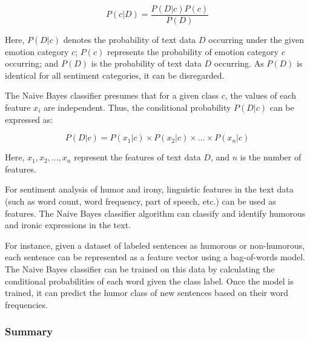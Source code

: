 \documentclass[a4paper]{article}
\begin{document}
$$P(c|D)=\dfrac{P(D|c)P(c)}{P(D)}$$

Here, $P(D|c)$ denotes the probability of text data $D$ occurring under the given emotion category $c$; $P(c)$ represents the probability of emotion category $c$ occurring; and $P(D)$ is the probability of text data $D$ occurring. As $P(D)$ is identical for all sentiment categories, it can be disregarded.

The Naive Bayes classifier presumes that for a given class $c$, the values of each feature $x_i$ are independent. Thus, the conditional probability $P(D|c)$ can be expressed as:

$$P(D|c)=P(x_1|c) \times P(x_2|c) \times ... \times P(x_n|c)$$

Here, $x_1, x_2, ..., x_n$ represent the features of text data $D$, and $n$ is the number of features.

For sentiment analysis of humor and irony, linguistic features in the text data (such as word count, word frequency, part of speech, etc.) can be used as features. The Naive Bayes classifier algorithm can classify and identify humorous and ironic expressions in the text.

For instance, given a dataset of labeled sentences as humorous or non-humorous, each sentence can be represented as a feature vector using a bag-of-words model. The Naive Bayes classifier can be trained on this data by calculating the conditional probabilities of each word given the class label. Once the model is trained, it can predict the humor class of new sentences based on their word frequencies.

\subsubsection{Summary}
\end{document}
